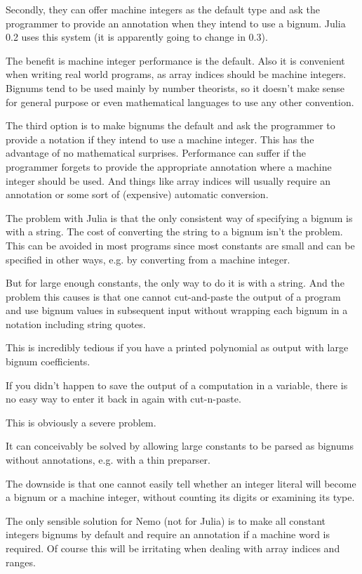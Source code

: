 \documentclass[a4paper,10pt]{article}
\begin{document}
Secondly, they can offer machine integers as the default type and ask the programmer to provide an
annotation when they intend to use a bignum. Julia 0.2 uses this system (it is apparently going to
change in 0.3).

The benefit is machine integer performance is the default. Also it is convenient when writing real
world programs, as array indices should be machine integers. Bignums tend to be used mainly by
number theorists, so it doesn't make sense for general purpose or even mathematical languages to
use any other convention.

The third option is to make bignums the default and ask the programmer to provide a notation if they
intend to use a machine integer. This has the advantage of no mathematical surprises. Performance can
suffer if the programmer forgets to provide the appropriate annotation where a machine integer should
be used. And things like array indices will usually require an annotation or some sort of (expensive)
automatic conversion.

The problem with Julia is that the only consistent way of specifying a bignum is with a string. The
cost of converting the string to a bignum isn't the problem. This can be avoided in most programs
since most constants are small and can be specified in other ways, e.g. by converting from a machine
integer.

But for large enough constants, the only way to do it is with a string. And the problem this causes
is that one cannot cut-and-paste the output of a program and use bignum values in subsequent input
without wrapping each bignum in a notation including string quotes.

This is incredibly tedious if you have a printed polynomial as output with large bignum coefficients.

If you didn't happen to save the output of a computation in a variable, there is no easy way to enter
it back in again with cut-n-paste. 

This is obviously a severe problem. 

It can conceivably be solved by allowing large constants to be parsed as bignums without annotations,
e.g. with a thin preparser.

The downside is that one cannot easily tell whether an integer literal will become a bignum or a
machine integer, without counting its digits or examining its type.

The only sensible solution for Nemo (not for Julia) is to make all constant integers bignums by default 
and require an annotation if a machine word is required. Of course this will be irritating when dealing 
with array indices and ranges.
\end{document}
